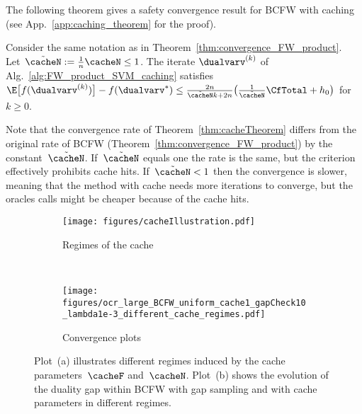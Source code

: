 \documentclass{article}
\begin{document}
The following theorem gives a safety convergence result for BCFW with caching (see App.~\ref{app:caching_theorem} for the proof).
\begin{theorem} \label{thm:cacheTheorem}
Consider the same notation as in Theorem~\ref{thm:convergence_FW_product}. Let~$\tilde{\cacheN} := \frac1n\cacheN \leq 1$. The iterate $\dualvarv^{(k)}$ of %
Alg.~\ref{alg:FW_product_SVM_caching} satisfies
$
\E\big[f(\dualvarv^{(k)})\big] - f(\dualvarv^*) \le \frac{2n}{\tilde{\cacheN}k+2n}\big(\frac{1}{\tilde{\cacheN}}\CfTotal+ h_0\big)
$
for $k\geq0$.
%
%
\end{theorem}
Note that the convergence rate of Theorem~\ref{thm:cacheTheorem} differs from the original rate of  BCFW (Theorem~\ref{thm:convergence_FW_product}) by the  constant~$\tilde{\cacheN}$.
If~$\tilde{\cacheN}$ equals one the rate is the same, but the criterion effectively prohibits cache hits.
If~$\tilde{\cacheN} < 1$ then the convergence is slower, meaning that the method with cache needs more iterations to converge, but the oracles calls might be cheaper because of the cache hits.

%
%
%
%
%
%
%

\begin{figure}
    \centering
    \begin{subfigure}[b]{0.22\textwidth}
        \texttt{[image: figures/cacheIllustration.pdf]}
        \caption{Regimes of the cache\label{fig:caching_a}\vspace{-2mm}}
    \end{subfigure}
    ~
    \begin{subfigure}[b]{0.22\textwidth}
        \texttt{[image: figures/ocr\_large\_BCFW\_uniform\_cache1\_gapCheck10\_lambda1e-3\_different\_cache\_regimes.pdf]}
        \caption{Convergence plots\label{fig:caching_b}\vspace{-2mm}}
    \end{subfigure}
    \caption{ Plot~(a) illustrates different regimes induced by the cache parameters~$\cacheF$ and~$\cacheN$. Plot~(b) shows the evolution of the duality gap within BCFW with gap sampling and with cache parameters in different regimes. \label{fig:caching} \vspace{-3mm}}
\end{figure}

%
\end{document}
